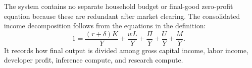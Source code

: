 The system contains no separate household budget or final-good zero-profit
equation because these are redundant after market clearing. The consolidated
income decomposition follows from the equations in the definition:
\begin{equation}
 1=\frac{(r+\delta)K}{Y}+\frac{wL}{Y}
 +\frac{\Pi}{Y}+\frac{U}{Y}+\frac{M}{Y}.
 \label{eq:rewrite-income-decomposition}
\end{equation}
It records how final output is divided among gross capital income, labor income,
developer profit, inference compute, and research compute. %
